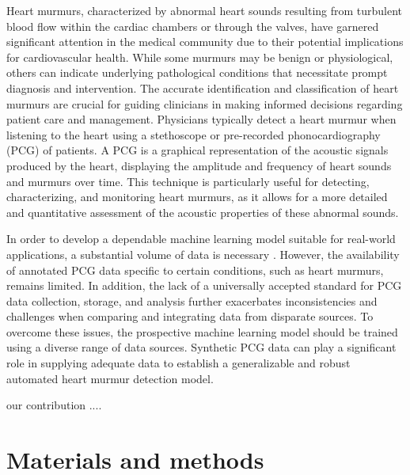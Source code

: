\documentclass{article}
\begin{document}
\par Heart murmurs, characterized by abnormal heart sounds resulting from turbulent blood flow within the cardiac chambers or through the valves, have garnered significant attention in the medical community due to their potential implications for cardiovascular health. While some murmurs may be benign or physiological, others can indicate underlying pathological conditions that necessitate prompt diagnosis and intervention. The accurate identification and classification of heart murmurs are crucial for guiding clinicians in making informed decisions regarding patient care and management. Physicians typically detect a heart murmur when listening to the heart using a stethoscope or pre-recorded phonocardiography (PCG) of patients. A PCG is a graphical representation of the acoustic signals produced by the heart, displaying the amplitude and frequency of heart sounds and murmurs over time. This technique is particularly useful for detecting, characterizing, and monitoring heart murmurs, as it allows for a more detailed and quantitative assessment of the acoustic properties of these abnormal sounds.

\par In order to develop a dependable machine learning model suitable for real-world applications, a substantial volume of data is necessary \cite{alom2019state}. However, the availability of annotated PCG data specific to certain conditions, such as heart murmurs, remains limited. In addition, the lack of a universally accepted standard for PCG data collection, storage, and analysis further exacerbates inconsistencies and challenges when comparing and integrating data from disparate sources. To overcome these issues, the prospective machine learning model should be trained using a diverse range of data sources. Synthetic PCG data can play a significant role in supplying adequate data to establish a generalizable and robust automated heart murmur detection model.


\par our contribution ....


\section{Materials and methods}
\end{document}
